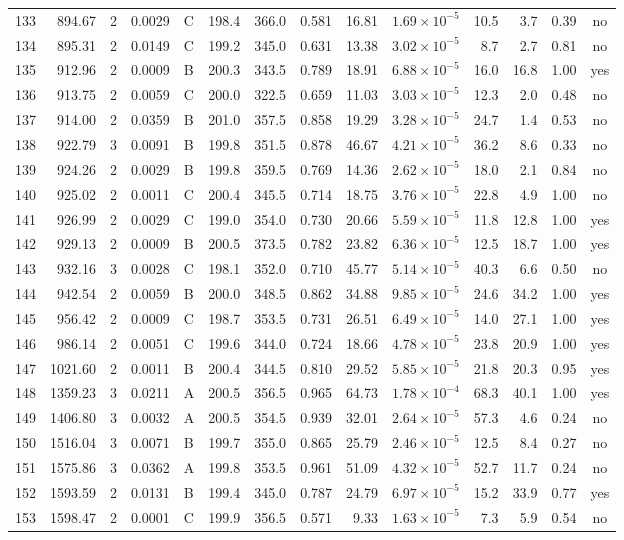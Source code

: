 \begin{landscape}
\begin{longtable}{rrrrlrrrrrrrrc}
133 & 894.67 & 2 & 0.0029 & C & 198.4 & 366.0 & 0.581 & 16.81 & $1.69\times10^{-5}$ & 10.5 & 3.7 & 0.39 & no \\
134 & 895.31 & 2 & 0.0149 & C & 199.2 & 345.0 & 0.631 & 13.38 & $3.02\times10^{-5}$ & 8.7 & 2.7 & 0.81 & no \\
135 & 912.96 & 2 & 0.0009 & B & 200.3 & 343.5 & 0.789 & 18.91 & $6.88\times10^{-5}$ & 16.0 & 16.8 & 1.00 & yes \\
136 & 913.75 & 2 & 0.0059 & C & 200.0 & 322.5 & 0.659 & 11.03 & $3.03\times10^{-5}$ & 12.3 & 2.0 & 0.48 & no \\
137 & 914.00 & 2 & 0.0359 & B & 201.0 & 357.5 & 0.858 & 19.29 & $3.28\times10^{-5}$ & 24.7 & 1.4 & 0.53 & no \\
138 & 922.79 & 3 & 0.0091 & B & 199.8 & 351.5 & 0.878 & 46.67 & $4.21\times10^{-5}$ & 36.2 & 8.6 & 0.33 & no \\
139 & 924.26 & 2 & 0.0029 & B & 199.8 & 359.5 & 0.769 & 14.36 & $2.62\times10^{-5}$ & 18.0 & 2.1 & 0.84 & no \\
140 & 925.02 & 2 & 0.0011 & C & 200.4 & 345.5 & 0.714 & 18.75 & $3.76\times10^{-5}$ & 22.8 & 4.9 & 1.00 & no \\
141 & 926.99 & 2 & 0.0029 & C & 199.0 & 354.0 & 0.730 & 20.66 & $5.59\times10^{-5}$ & 11.8 & 12.8 & 1.00 & yes \\
142 & 929.13 & 2 & 0.0009 & B & 200.5 & 373.5 & 0.782 & 23.82 & $6.36\times10^{-5}$ & 12.5 & 18.7 & 1.00 & yes \\
143 & 932.16 & 3 & 0.0028 & C & 198.1 & 352.0 & 0.710 & 45.77 & $5.14\times10^{-5}$ & 40.3 & 6.6 & 0.50 & no \\
144 & 942.54 & 2 & 0.0059 & B & 200.0 & 348.5 & 0.862 & 34.88 & $9.85\times10^{-5}$ & 24.6 & 34.2 & 1.00 & yes \\
145 & 956.42 & 2 & 0.0009 & C & 198.7 & 353.5 & 0.731 & 26.51 & $6.49\times10^{-5}$ & 14.0 & 27.1 & 1.00 & yes \\
146 & 986.14 & 2 & 0.0051 & C & 199.6 & 344.0 & 0.724 & 18.66 & $4.78\times10^{-5}$ & 23.8 & 20.9 & 1.00 & yes \\
147 & 1021.60 & 2 & 0.0011 & B & 200.4 & 344.5 & 0.810 & 29.52 & $5.85\times10^{-5}$ & 21.8 & 20.3 & 0.95 & yes \\
148 & 1359.23 & 3 & 0.0211 & A & 200.5 & 356.5 & 0.965 & 64.73 & $1.78\times10^{-4}$ & 68.3 & 40.1 & 1.00 & yes \\
149 & 1406.80 & 3 & 0.0032 & A & 200.5 & 354.5 & 0.939 & 32.01 & $2.64\times10^{-5}$ & 57.3 & 4.6 & 0.24 & no \\
150 & 1516.04 & 3 & 0.0071 & B & 199.7 & 355.0 & 0.865 & 25.79 & $2.46\times10^{-5}$ & 12.5 & 8.4 & 0.27 & no \\
151 & 1575.86 & 3 & 0.0362 & A & 199.8 & 353.5 & 0.961 & 51.09 & $4.32\times10^{-5}$ & 52.7 & 11.7 & 0.24 & no \\
152 & 1593.59 & 2 & 0.0131 & B & 199.4 & 345.0 & 0.787 & 24.79 & $6.97\times10^{-5}$ & 15.2 & 33.9 & 0.77 & yes \\
153 & 1598.47 & 2 & 0.0001 & C & 199.9 & 356.5 & 0.571 & 9.33 & $1.63\times10^{-5}$ & 7.3 & 5.9 & 0.54 & no \\
\end{longtable}
\endgroup
\end{landscape}
